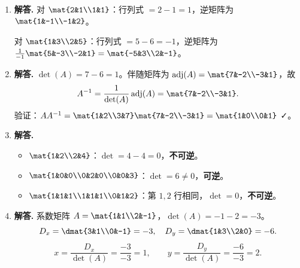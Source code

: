\begin{enumerate}[label=\textbf{\arabic*.}, leftmargin=*, itemsep=1em]
  \item \textbf{解答.}
  对 $\mat{2&1\\1&1}$：行列式 $=2-1=1$，逆矩阵为
  $\mat{1&-1\\-1&2}$。

  对 $\mat{1&3\\2&5}$：行列式 $=5-6=-1$，逆矩阵为
  $\frac{1}{-1}\mat{5&-3\\-2&1}=\mat{-5&3\\2&-1}$。

  \item \textbf{解答.}
  $\det(A)=7-6=1$。伴随矩阵为
  $\operatorname{adj}(A)=\mat{7&-2\\-3&1}$，故
  \[
    A^{-1}=\frac{1}{\det(A)}\operatorname{adj}(A)=\mat{7&-2\\-3&1}.
  \]
  验证：$AA^{-1}=\mat{1&2\\3&7}\mat{7&-2\\-3&1}=\mat{1&0\\0&1}$ ✓。

  \item \textbf{解答.}
  \begin{itemize}
    \item $\mat{1&2\\2&4}$：$\det=4-4=0$，\textbf{不可逆}。
    \item $\mat{1&0&0\\0&2&0\\0&0&3}$：$\det=6\ne0$，\textbf{可逆}。
    \item $\mat{1&1&1\\1&1&1\\0&1&2}$：第 $1,2$ 行相同，$\det=0$，\textbf{不可逆}。
  \end{itemize}

  \item \textbf{解答.}
  系数矩阵 $A=\mat{1&1\\2&-1}$，$\det(A)=-1-2=-3$。
  \[
    D_x=\dmat{3&1\\0&-1}=-3,\quad D_y=\dmat{1&3\\2&0}=-6.
  \]
  \[
    x=\frac{D_x}{\det(A)}=\frac{-3}{-3}=1,\qquad y=\frac{D_y}{\det(A)}=\frac{-6}{-3}=2.
  \]


\end{enumerate}
